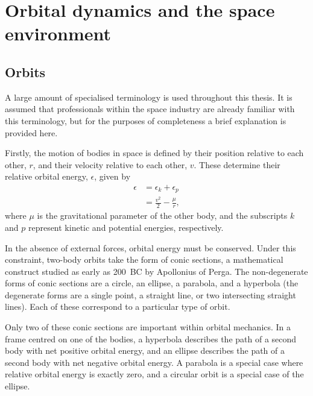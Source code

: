\chapter{Orbital dynamics and the space environment} \label{cha:Orbital-dynamics}

\section{Orbits} \label{sec:Orbits}

A large amount of specialised terminology is used throughout this thesis. It is assumed that professionals within the space industry are already familiar with this terminology, but for the purposes of completeness a brief explanation is provided here. 

Firstly, the motion of bodies in space is defined by their position relative to each other, $r$, and their velocity relative to each other, $v$. These determine their relative orbital energy, $\epsilon$, given by %
\begin{subequations} \label{eq:Specific-orbital-energy}
\begin{align} 
\epsilon &= \epsilon_k + \epsilon_p \\
&= \frac{v^2}{2} - \frac{\mu}{r},
\end{align}
\end{subequations}
where $\mu$ is the gravitational parameter of the other body, and the subscripts $k$ and $p$ represent kinetic and potential energies, respectively.

In the absence of external forces, orbital energy must be conserved. Under this constraint, two-body orbits take the form of conic sections, a mathematical construct studied as early as 200~BC by Apollonius of Perga. The non-degenerate forms of conic sections are a circle, an ellipse, a parabola, and a hyperbola (the degenerate forms are a single point, a straight line, or two intersecting straight lines). Each of these correspond to a particular type of orbit. 

Only two of these conic sections are important within orbital mechanics. In a frame centred on one of the bodies, a hyperbola describes the path of a second body with net positive orbital energy, and an ellipse describes the path of a second body with net negative orbital energy. A parabola is a special case where relative orbital energy is exactly zero, and a circular orbit is a special case of the ellipse. 

